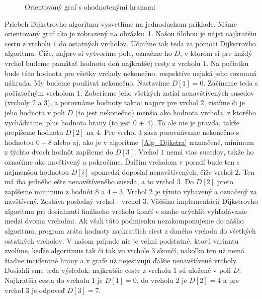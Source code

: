\begin{figure}[H]
  \caption{Orientovaný graf s ohodnotenými hranami}
  \label{dijkstra_priklad}
\end{figure}

Priebeh Dijkstrovho algoritmu vysvetlíme na jednoduchom príklade. Máme orientovaný graf ako je zobrazený na obrázku~\ref{dijkstra_priklad}. Našou úlohou je nájsť najkratšiu cestu z vrcholu $1$ do ostatných vrcholov. Učiníme tak teda za pomoci Dijkstrovho algoritmu. Čiže, najprv si vytvoríme pole, označme ho $D$, v ktorom si pre každý vrchol budeme pamätať hodnotu doň najkratšej cesty z vrcholu $1$. Na počiatku bude táto hodnota pre všetky vrcholy nekonečno, respektíve nejaká jeho rozumná náhrada. My budeme používať nekonečno. Nastavíme $D [1] = 0$. Začíname teda s počiatočným vrcholom $1$. Zoberieme jeho všetkých zatiaľ nenavštívených susedov (vrcholy $2$ a $3$), a porovnáme hodnoty takto: najprv pre vrchol $2$, zistíme či je jeho hodnota v poli $D$ (to jest nekonečno) menšia ako hodnota vrchola, z ktorého vychádzame, plus hodnota hrany (to jest 0 + 4). To ale nie je pravda, takže prepíšeme hodnotu $D [2]$ na $4$. Pre vrchol $3$ zasa porovnávame nekonečno s hodnotou $0+8$ alebo aj, ako je v algoritme~\ref{Alg_Dijkstra} naznačené, minimum z týchto dvoch hodnôt zapíšeme do $D [3]$. Vrchol $1$ nemá viac susedov, takže ho označíme ako navštívený a pokročíme. Ďalším vrcholom v poradí bude ten s najmenšou hodnotou $D [i]$ spomedzi doposiaľ nenavštívených, čiže vrchol $2$. Ten má iba jedného ešte nenavštíveného suseda, a to vrchol $3$. Do $D [2]$ preto zapíšeme minimum z hodnôt $8$ a $4 + 3$. Vrchol $2$ je týmto vybavený a označený za navštívený. Zostáva posledný vrchol - vrchol $3$. Väčšina implementácií Dijkstrovho algoritmu pri dosiahnutí finálneho vrcholu končí v snahe urýchliť vyhľadávanie medzi dvoma vrcholmi. Ak však túto podmienku nezakomponujeme do nášho algoritmu, program zráta hodnoty najkratších ciest z daného vrcholu do všetkých ostatných vrcholov. V našom prípade nie je veľmi podstatné, ktorú variantu zvolíme, keďže algoritmus tak či tak vo vrchole $3$ skončí, nakoľko ten už nemá žiadne incidentné hrany a v grafe už nejestvujú ďalšie nenavštívené vrcholy. Dosiahli sme teda výsledok: najkratšie cesty z vrcholu $1$ sú uložené v poli $D$. Najkratšia cesta do vrcholu $1$ je $D [1] = 0$, do vrcholu $2$ je $D [2] = 4$ a pre vrchol $3$ je odpoveď $D [3] = 7$.\newline

